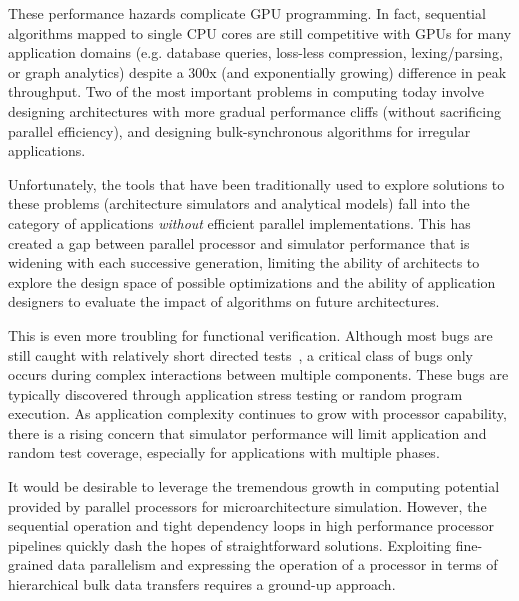 \documentclass[conference, 10pt]{IEEEtran}
\begin{document}
These performance hazards complicate GPU programming. In fact, sequential
algorithms mapped to single CPU cores are still competitive with GPUs for many
application domains (e.g. database queries, loss-less compression,
lexing/parsing, or graph analytics) despite a 300x (and exponentially growing)
difference in peak throughput.  Two of the most important problems in computing
today involve designing architectures with more gradual performance cliffs
(without sacrificing parallel efficiency), and
designing bulk-synchronous algorithms for irregular applications.  

Unfortunately, the tools that have been traditionally used to explore solutions
to these problems (architecture simulators and analytical models) fall into the
category of applications \textit{without} efficient parallel implementations. 
This has created a gap between parallel processor and simulator performance that
is widening with each successive generation, limiting the ability of architects
to explore the design space of possible optimizations and the ability of
application designers to evaluate the impact of algorithms on future
architectures.  

This is even more troubling for functional verification.  Although most bugs are
still caught with relatively short directed tests~\cite{ref:bug-distributions},
a critical class of bugs only occurs during complex interactions between
multiple components.  These bugs are typically discovered through application
stress testing or random program execution.   As application complexity
continues to grow with processor capability, there is a rising concern that
simulator performance will limit application and random test coverage,
especially for applications with multiple phases.  

It would be desirable to leverage the tremendous growth in computing potential
provided by parallel processors for microarchitecture simulation.  However,
the sequential operation and tight dependency loops in high performance 
processor pipelines quickly dash the hopes of straightforward solutions.
Exploiting fine-grained data parallelism and expressing the operation of a
processor in terms of hierarchical bulk data transfers requires a ground-up
approach.
\end{document}
